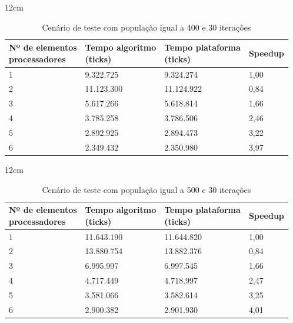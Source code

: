 \begin{table}[h]{12cm}
    \caption{Cenário de teste com população igual a 400 e 30 iterações}
    \label{cenario9}
    \begin{tabular}{llll}
        \hline
        \shortstack[l]{Nº de elementos \\ processadores} & \shortstack[l]{Tempo algoritmo \\ (ticks)} & \shortstack[l]{Tempo plataforma \\ (ticks)} & Speedup \\
        \hline
        1 & 9.322.725  & 9.324.274  & 1,00 \\
        2 & 11.123.300 & 11.124.922 & 0,84 \\
        3 & 5.617.266  & 5.618.814  & 1,66 \\
        4 & 3.785.258  & 3.786.506  & 2,46 \\
        5 & 2.892.925  & 2.894.473  & 3,22 \\
        6 & 2.349.432  & 2.350.980  & 3,97 \\
        \hline
    \end{tabular}
\end{table}

\begin{table}[h]{12cm}
    \caption{Cenário de teste com população igual a 500 e 30 iterações}
    \label{cenario10}
    \begin{tabular}{llll}
        \hline
        \shortstack[l]{Nº de elementos \\ processadores} & \shortstack[l]{Tempo algoritmo \\ (ticks)} & \shortstack[l]{Tempo plataforma \\ (ticks)} & Speedup \\
        \hline
        1 & 11.643.190 & 11.644.820 & 1,00 \\
        2 & 13.880.754 & 13.882.376 & 0,84 \\
        3 & 6.995.997  & 6.997.545  & 1,66 \\
        4 & 4.717.449  & 4.718.997  & 2,47 \\
        5 & 3.581.066  & 3.582.614  & 3,25 \\
        6 & 2.900.382  & 2.901.930  & 4,01 \\
        \hline
    \end{tabular}
\end{table}

